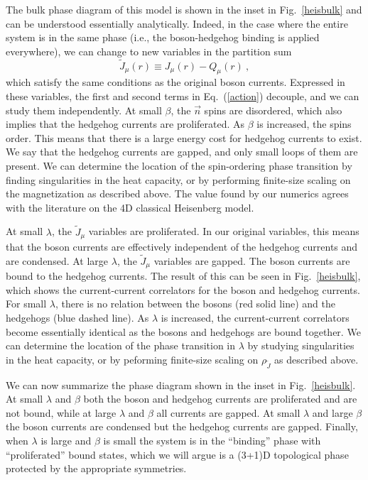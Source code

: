 The bulk phase diagram of this model is shown in the inset in Fig.~\ref{heisbulk} and can be understood essentially analytically.  Indeed, in the case where the entire system is in the same phase (i.e., the boson-hedgehog binding is applied everywhere), we can change to new variables in the partition sum
\begin{equation}
\tilde J_\mu(r) \equiv J_\mu(r) - Q_\mu(r) ~,
\label{shift}
\end{equation}
which satisfy the same conditions as the original boson currents.  Expressed in these variables, the first and second terms in Eq.~(\ref{action}) decouple, and we can study them independently. 
At small $\beta$, the $\vec{n}$ spins are disordered, which also implies that the hedgehog currents are proliferated. As $\beta$ is increased, the spins order. This means that there is a large energy cost for hedgehog currents to exist. We say that the hedgehog currents are gapped, and only small loops of them are present. We can determine the location of the spin-ordering phase transition by finding singularities in the heat capacity, or by performing finite-size scaling on the magnetization as described above. The value found by our numerics agrees with the literature on the 4D classical Heisenberg model.\cite{McKenzie2}

At small $\lambda$, the $\tilde J_\mu$ variables are proliferated. In our original variables, this means that the boson currents are effectively independent of the hedgehog currents and are condensed. At large $\lambda$, the $\tilde J_\mu$ variables are gapped. The boson currents are bound to the hedgehog currents. The result of this can be seen in Fig.~\ref{heisbulk}, which shows the current-current correlators for the boson and hedgehog currents. For small $\lambda$, there is no relation between the bosons (red solid line) and the hedgehogs (blue dashed line). As $\lambda$ is increased, the current-current correlators become essentially identical as the bosons and hedgehogs are bound together. We can determine the location of the phase transition in $\lambda$ by studying singularities in the heat capacity, or by peforming finite-size scaling on $\rho_{\tilde J}$ as described above. 

We can now summarize the phase diagram shown in the inset in Fig.~\ref{heisbulk}. At small $\lambda$ and $\beta$ both the boson and hedgehog currents are proliferated and are not bound, while at large $\lambda$ and $\beta$ all currents are gapped. At small $\lambda$ and large $\beta$ the boson currents are condensed but the hedgehog currents are gapped. Finally, when $\lambda$ is large and $\beta$ is small the system is in the ``binding'' phase with ``proliferated'' bound states, which we will argue is a (3+1)D topological phase protected by the appropriate symmetries.


